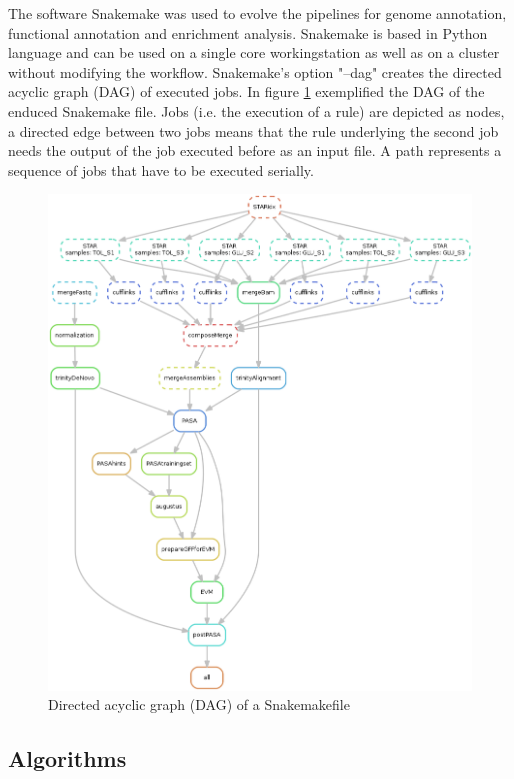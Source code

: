 \documentclass[11pt, a4paper]{report}
\begin{document}
The software Snakemake was used to evolve the pipelines for genome annotation, functional annotation and enrichment analysis. Snakemake is based in Python language and can be used on a single core workingstation as well as on a cluster without modifying the workflow. 
Snakemake's option "--dag" creates the directed acyclic graph (DAG) of executed jobs. \cite{Koster2012}  
\newline
In figure \ref{fig:DAG} exemplified the DAG of the enduced Snakemake file. Jobs (i.e. the execution of a rule) are depicted as nodes, a directed edge between two jobs means that the rule underlying the second job needs the output of the job executed before as an input file. A path represents a sequence of jobs that have to be executed serially.
\begin{figure}[H]
	\centering	
	\includegraphics[width=400pt]{DAG.png}
	\caption[Directed acyclic graph (DAG)]
	{Directed acyclic graph (DAG) of a Snakemakefile}
	\label{fig:DAG}
\end{figure}
\newpage
\subsection{Algorithms}
\end{document}
